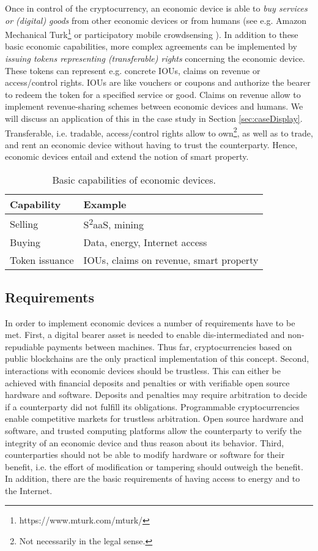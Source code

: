 Once in control of the cryptocurrency, an economic device is able to \emph{buy services or (digital) goods} from other economic devices or from humans (see e.g. Amazon Mechanical Turk\footnote{https://www.mturk.com/mturk/} or participatory mobile crowdsensing \parencite{burke2006participatory}). In addition to these basic economic capabilities, more complex agreements can be implemented by \emph{issuing tokens representing (transferable) rights} concerning the economic device. These tokens can represent e.g. concrete IOUs, claims on revenue or access/control rights. IOUs are like vouchers or coupons and authorize the bearer to redeem the token for a specified service or good. Claims on revenue allow to implement revenue-sharing schemes between economic devices and humans. We will discuss an application of this in the case study in Section \ref{sec:caseDisplay}.
Transferable, i.e. tradable, access/control rights allow to own\footnote{Not necessarily in the legal sense.}, as well as to trade, and rent an economic device without having to trust the counterparty. Hence, economic devices entail and extend the notion of smart property.

\begin{table}
  \centering
  \begin{tabularx}{\textwidth}{ l  X  }
    \toprule
    Capability  & Example \\
    \midrule
    Selling & S\textsuperscript{2}aaS, mining \\ 
    Buying & Data, energy, Internet access \\ 
    Token issuance & IOUs, claims on revenue, smart property \\  
    \bottomrule
  \end{tabularx}
  \caption{Basic capabilities of economic devices.}
  \label{tbl:capabilities}
\end{table}


\subsection{Requirements}

In order to implement economic devices a number of requirements have to be met.
First, a digital bearer asset is needed to enable dis-intermediated and non-repudiable payments between machines. Thus far, cryptocurrencies based on public blockchains are the only practical implementation of this concept. Second, interactions with economic devices should be trustless. This can either be achieved with financial deposits and penalties or with verifiable open source hardware and software. Deposits and penalties may require arbitration to decide if a counterparty did not fulfill its obligations. Programmable cryptocurrencies enable competitive markets for trustless arbitration. Open source hardware and software, and trusted computing platforms allow the counterparty to verify the integrity of an economic device and thus reason about its behavior. Third, counterparties should not be able to modify hardware or software for their benefit, i.e. the effort of modification or tampering should outweigh the benefit. In addition, there are the basic requirements of having access to energy and to the Internet. 

